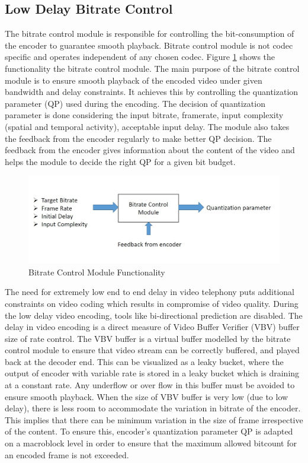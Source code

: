 \documentclass[11pt]{article} %
\begin{document}
  \subsection{Low Delay Bitrate Control}
	The bitrate control module is responsible for controlling the bit-consumption of the encoder to guarantee smooth playback. Bitrate control module is not codec specific and operates independent of any chosen codec. Figure \ref{fig:Bitrate Control Module Functionality} shows the functionality the bitrate control module. The main purpose of the bitrate control module is to ensure smooth playback of the encoded video under given bandwidth and delay constraints.  It achieves this by controlling the quantization parameter (QP) used during the encoding. The decision of quantization parameter is done considering the input bitrate, framerate, input complexity (spatial and temporal activity), acceptable input delay. The module also takes the feedback from the encoder regularly to make better QP decision.  The feedback from the encoder gives information about the content of the video and helps the module to decide the right QP for a given bit budget.
\begin{figure}[h]
    \centering
    \includegraphics[scale=0.5]{RC_block}
    \caption{Bitrate Control Module Functionality}
    \label{fig:Bitrate Control Module Functionality}
\end{figure} 

The need for extremely low end to end delay in video telephony puts additional constraints on video coding which results in compromise of video quality. During the low delay video encoding, tools like bi-directional prediction are disabled. The delay in video encoding is a direct measure of Video Buffer Verifier (VBV) buffer size of rate control. The VBV buffer is a virtual buffer modelled by the bitrate control module to ensure that video stream can be correctly buffered, and played back at the decoder end. This can be visualized as a leaky bucket, where the output of encoder with variable rate is stored in a leaky bucket which is draining at a constant rate. Any underflow or over flow in this buffer must be avoided to ensure smooth playback. When the size of VBV buffer is very low (due to low delay), there is less room to accommodate the variation in bitrate of the encoder. This implies that there can be minimum variation in the size of frame irrespective of the content. To ensure this, encoder's quantization parameter QP is adapted on a macroblock level in order to ensure that the maximum allowed bitcount for an encoded frame is not exceeded.
\end{document}
